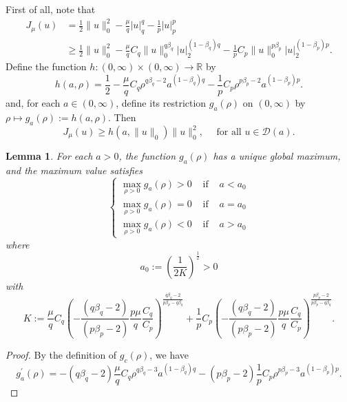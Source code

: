 \documentclass[11pt]{amsart}
\newtheorem{lemma}[theorem]{Lemma}
\numberwithin{equation}{section}
\begin{document}
{{  First of all, note that
  \begin{equation}\label{eqJF}
    \begin{aligned}
        J_\mu(u) & =\frac{1}{2}\|u\|_0^2-\frac{\mu}{q}|u|_q^q-\frac{1}{p}|u|_p^p \\
        & \geq \frac{1}{2}\|u\|_0^2-\frac{\mu}{q}C_q\|u\|_0^{q \beta_q}|u|_2^{(1-\beta_q) q}-\frac{1}{p}C_p\|u\|_0^{p \beta_p}|u|_2^{(1-\beta_p) p}.
    \end{aligned}
  \end{equation}
  Define the function {$h:(0,\infty) \times(0,\infty) \rightarrow \mathbb{R}$} by
  \begin{equation}
  {	h(a,\rho)=\frac{1}{2}-\frac{\mu}{q}C_q\rho^{q\beta_q-2}a^{(1-\beta_q) q}-\frac{1}{p}C_p\rho^{p\beta_p-2}a^{(1-\beta_p) p}.}
  \end{equation}
  and, for each $a \in(0, \infty)$, define its restriction $g_a(\rho)$ on $(0, \infty)$ by $\rho \mapsto {g_a(\rho):=h(a, \rho)}$.
  Then
  \begin{equation}\label{Eq-Phi>f}
    J_{\mu}(u) \geq {h\left(a,\|u\|_{0}\right)\| u\|_{0}^2}, \quad \text { for all } u \in \mathcal{D}(a).
  \end{equation}
  \begin{lemma}\label{lem5-g}
  For each $a>0$, the function $g_a(\rho)$ has a unique global maximum, and the maximum value satisfies
  $$
  \left\{\begin{array}{lll}
    \max _{\rho>0} g_a(\rho)>0 & \text { if } & a<a_0 \\
    \max _{\rho>0} g_a(\rho)=0 & \text { if } & a=a_0 \\
    \max _{\rho>0} g_a  (\rho)<0 & \text { if } & a>a_0
  \end{array}\right.
  $$
  where
  \begin{equation}\label{eq-a0}
  a_0:=\left(\frac{1}{2 K}\right)^{\frac{1}{2}}>0
  \end{equation}
  with
  $$
  K:=\frac{\mu}{q}C_q
  \left(-\frac{\left(q \beta_q-2\right)}{\left(p \beta_p-2\right)}
  \frac{p \mu}{q}
  \frac{C_q}{C_p}\right)
  ^{\frac{q\beta_q-2}{p \beta_p-q \beta_q}}
  +
  \frac{1}{p}C_p
  \left(-\frac{\left(q \beta_q-2\right)}{\left(p \beta_p-2\right)}
  \frac{p \mu}{q}
  \frac{C_q}{C_p}\right)
  ^{\frac{p\beta_p-2}{p \beta_p-q \beta_q}}.
  $$
  \end{lemma}
    \begin{proof}
    By the definition of $g_c(\rho)$, we have
    \begin{equation}
        g_a^{\prime}(\rho)=-(q\beta_q-2)\frac{\mu}{q}C_q\rho^{q\beta_q-3}a^{(1-\beta_q) q}-(p\beta_p-2)\frac{1}{p}C_p\rho^{p\beta_p-3}a^{(1-\beta_p) p} .

\end{equation}
\end{proof}}}
\end{document}
